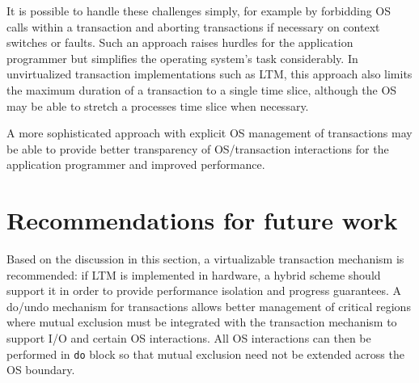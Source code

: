 It is possible to handle these challenges simply, for example by
forbidding OS calls within a transaction and aborting transactions if
necessary on context switches or faults.  Such an approach raises
hurdles for the application programmer but simplifies the operating
system's task considerably.  In unvirtualized transaction
implementations such as LTM, this approach also limits the maximum
duration of a transaction to a single time slice, although the OS may
be able to stretch a processes time slice when necessary.

A more sophisticated approach with explicit OS management of
transactions may be able to provide better transparency of
OS/transaction interactions for the application programmer and
improved performance.

\section{Recommendations for future work}
Based on the discussion in this section, a virtualizable transaction
mechanism is recommended: if LTM is implemented in hardware, a hybrid
scheme should support it in order to provide performance isolation and
progress guarantees.  A do/undo mechanism for transactions allows
better management of critical regions where mutual exclusion must be
integrated with the transaction mechanism to support I/O and certain
OS interactions.  All OS interactions can then be performed in
\texttt{do} block so that mutual exclusion need not be extended across
the OS boundary.

